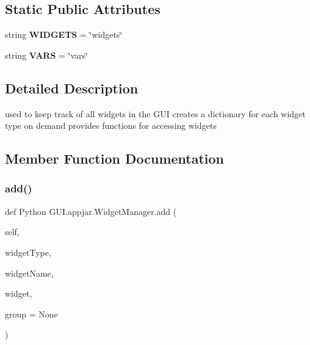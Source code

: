 \subsection*{Static Public Attributes}
\begin{DoxyCompactItemize}
\item 
\mbox{\label{class_python_01_g_u_i_1_1appjar_1_1_widget_manager_ac746cefa5ba11e11569ac530658b917e}} 
string {\bfseries W\+I\+D\+G\+E\+TS} = \char`\"{}widgets\char`\"{}
\item 
\mbox{\label{class_python_01_g_u_i_1_1appjar_1_1_widget_manager_a23e344e4c9ce605e493c67e31a7f367e}} 
string {\bfseries V\+A\+RS} = \char`\"{}vars\char`\"{}
\end{DoxyCompactItemize}


\subsection{Detailed Description}
\begin{DoxyVerb}used to keep track of all widgets in the GUI
    creates a dictionary for each widget type on demand
    provides functions for accessing widgets \end{DoxyVerb}
 

\subsection{Member Function Documentation}
\mbox{\label{class_python_01_g_u_i_1_1appjar_1_1_widget_manager_ac5dabd1d3e7ea54577b0f0834ee7cf84}} 
\subsubsection{\texorpdfstring{add()}{add()}}
{\footnotesize\ttfamily def Python G\+U\+I.\+appjar.\+Widget\+Manager.\+add (\begin{DoxyParamCaption}\item[{}]{self,  }\item[{}]{widget\+Type,  }\item[{}]{widget\+Name,  }\item[{}]{widget,  }\item[{}]{group = {\ttfamily None} }\end{DoxyParamCaption})}

